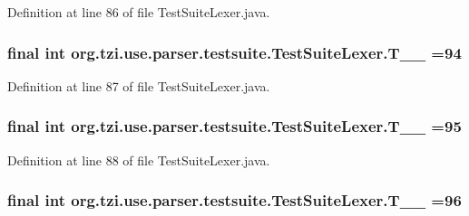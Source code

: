 Definition at line 86 of file Test\-Suite\-Lexer.\-java.

\hypertarget{classorg_1_1tzi_1_1use_1_1parser_1_1testsuite_1_1_test_suite_lexer_a7e4b37e03d3cc007fb305f8a1531450b}{
\subsubsection[{T\-\_\-\-\_\-94}]{\setlength{\rightskip}{0pt plus 5cm}final int org.\-tzi.\-use.\-parser.\-testsuite.\-Test\-Suite\-Lexer.\-T\-\_\-\-\_ =94\hspace{0.3cm}{\ttfamily [static]}}}\label{classorg_1_1tzi_1_1use_1_1parser_1_1testsuite_1_1_test_suite_lexer_a7e4b37e03d3cc007fb305f8a1531450b}


Definition at line 87 of file Test\-Suite\-Lexer.\-java.

\hypertarget{classorg_1_1tzi_1_1use_1_1parser_1_1testsuite_1_1_test_suite_lexer_a60f1d0d7a8b2ee19b058c6c061a19d06}{
\subsubsection[{T\-\_\-\-\_\-95}]{\setlength{\rightskip}{0pt plus 5cm}final int org.\-tzi.\-use.\-parser.\-testsuite.\-Test\-Suite\-Lexer.\-T\-\_\-\-\_ =95\hspace{0.3cm}{\ttfamily [static]}}}\label{classorg_1_1tzi_1_1use_1_1parser_1_1testsuite_1_1_test_suite_lexer_a60f1d0d7a8b2ee19b058c6c061a19d06}


Definition at line 88 of file Test\-Suite\-Lexer.\-java.

\hypertarget{classorg_1_1tzi_1_1use_1_1parser_1_1testsuite_1_1_test_suite_lexer_af6d33e91ddd15df35b0f76252c29da14}{
\subsubsection[{T\-\_\-\-\_\-96}]{\setlength{\rightskip}{0pt plus 5cm}final int org.\-tzi.\-use.\-parser.\-testsuite.\-Test\-Suite\-Lexer.\-T\-\_\-\-\_ =96\hspace{0.3cm}{\ttfamily [static]}}}\label{classorg_1_1tzi_1_1use_1_1parser_1_1testsuite_1_1_test_suite_lexer_af6d33e91ddd15df35b0f76252c29da14}


